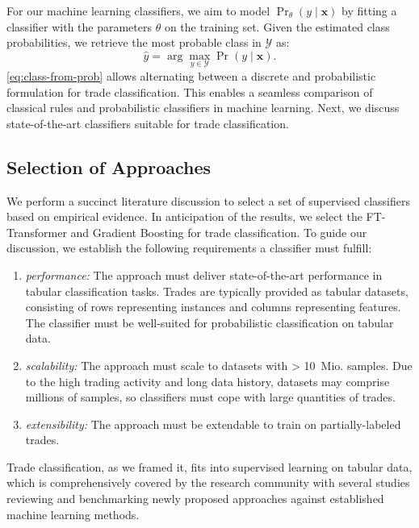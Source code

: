 For our machine learning classifiers, we aim to model $\Pr_{\theta}(y \mid \mathbf{x})$ by fitting a classifier with the parameters $\theta$ on the training set. Given the estimated class probabilities, we retrieve the most probable class in $\mathcal{Y}$ as:
\begin{equation}
    \hat{y}=\arg\max_{y \in \mathcal{Y}} \operatorname{Pr}(y \mid \mathbf{x}).
    \label{eq:class-from-prob}
\end{equation}
\cref{eq:class-from-prob} allows alternating between a discrete and probabilistic formulation for trade classification. This enables a seamless comparison of classical rules and probabilistic classifiers in machine learning.
Next, we discuss state-of-the-art classifiers suitable for trade classification.

\subsection{Selection of Approaches}\label{sec:selection-of-approaches}

We perform a succinct literature discussion to select a set of supervised classifiers based on empirical evidence. In anticipation of the results, we select the FT-Transformer and Gradient Boosting for trade classification. To guide our discussion, we establish the following requirements a classifier must fulfill:
\begin{enumerate}[label=(\roman*),noitemsep]
\item \emph{performance:} The approach must deliver state-of-the-art performance in tabular classification tasks. Trades are typically provided as tabular datasets, consisting of rows representing instances and columns representing features. The classifier must be well-suited for probabilistic classification on tabular data.
\item \emph{scalability:}  The approach must scale to datasets with > 10~Mio. samples. Due to the high trading activity and long data history, datasets may comprise millions of samples, so classifiers must cope with large quantities of trades.
\item \emph{extensibility:} The approach must be extendable to train on partially-labeled trades.
\end{enumerate}

Trade classification, as we framed it, fits into supervised learning on tabular data, which is comprehensively covered by the research community with several studies reviewing and benchmarking newly proposed approaches against established machine learning methods.

